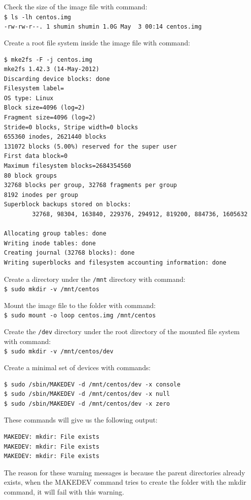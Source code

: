 Check the size of the image file with command:\\
\verb|$ ls -lh centos.img| \\
\verb|-rw-rw-r--. 1 shumin shumin 1.0G May  3 00:14 centos.img|

Create a root file system inside the image file with command: 
\lstset{style=bashstyle}
\begin{lstlisting}
$ mke2fs -F -j centos.img
mke2fs 1.42.3 (14-May-2012)
Discarding device blocks: done
Filesystem label=
OS type: Linux
Block size=4096 (log=2)
Fragment size=4096 (log=2)
Stride=0 blocks, Stripe width=0 blocks
655360 inodes, 2621440 blocks
131072 blocks (5.00%) reserved for the super user
First data block=0
Maximum filesystem blocks=2684354560
80 block groups
32768 blocks per group, 32768 fragments per group
8192 inodes per group
Superblock backups stored on blocks:
        32768, 98304, 163840, 229376, 294912, 819200, 884736, 1605632

Allocating group tables: done
Writing inode tables: done
Creating journal (32768 blocks): done
Writing superblocks and filesystem accounting information: done
\end{lstlisting}

Create a directory under the \verb|/mnt| directory with command: \\
\verb|$ sudo mkdir -v /mnt/centos|

Mount the image file to the folder with command: \\
\verb|$ sudo mount -o loop centos.img /mnt/centos|

Create the \verb|/dev| directory under the root directory of the mounted file system with command: \\
\verb|$ sudo mkdir -v /mnt/centos/dev|

Create a minimal set of devices with commands:
\lstset{style=bashstyle}
\begin{lstlisting}
$ sudo /sbin/MAKEDEV -d /mnt/centos/dev -x console
$ sudo /sbin/MAKEDEV -d /mnt/centos/dev -x null
$ sudo /sbin/MAKEDEV -d /mnt/centos/dev -x zero
\end{lstlisting}
These commands will give us the following output:
\lstset{style=bashstyle}
\begin{lstlisting}
MAKEDEV: mkdir: File exists
MAKEDEV: mkdir: File exists
MAKEDEV: mkdir: File exists
\end{lstlisting}

The reason for these warning messages is because the parent directories already exists, when the MAKEDEV command tries to create the folder with the mkdir command, it will fail with this warning.

